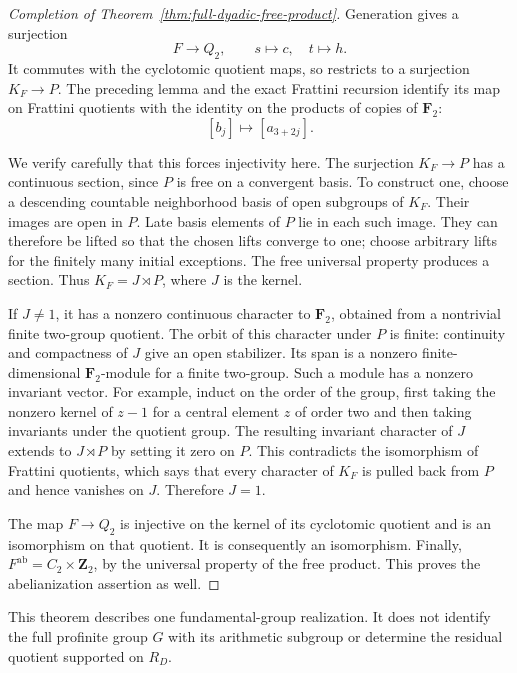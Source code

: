 \begin{proof}[Completion of Theorem~\ref{thm:full-dyadic-free-product}]
Generation gives a surjection
\[
                   F\longrightarrow Q_2,
                   \qquad s\longmapsto c,\quad t\longmapsto h.
\]
It commutes with the cyclotomic quotient maps, so restricts
to a surjection \(K_F\to P\).
The preceding lemma and the exact Frattini recursion identify
its map on Frattini quotients with the identity on the
products of copies of \(\mathbf F_2\):
\[
             [b_j]\longmapsto[a_{3+2j}].
\]

We verify carefully that this forces injectivity here.
The surjection \(K_F\to P\) has a continuous section, since
\(P\) is free on a convergent basis. To construct one, choose
a descending countable neighborhood basis of open subgroups
of \(K_F\). Their images are open in \(P\). Late basis
elements of \(P\) lie in each such image. They can therefore
be lifted so that the chosen lifts converge to one; choose
arbitrary lifts for the finitely many initial exceptions.
The free universal property produces a section.
Thus \(K_F=J\rtimes P\), where \(J\) is the kernel.

If \(J\ne1\), it has a nonzero continuous character to
\(\mathbf F_2\), obtained from a nontrivial finite two-group
quotient. The orbit of this character under \(P\) is finite:
continuity and compactness of \(J\) give an open stabilizer.
Its span is a nonzero finite-dimensional \(\mathbf F_2\)-module
for a finite two-group. Such a module has a nonzero invariant
vector. For example, induct on the order of the group, first
taking the nonzero kernel of \(z-1\) for a central element
\(z\) of order two and then taking invariants under the
quotient group.
The resulting invariant character of \(J\) extends to
\(J\rtimes P\) by setting it zero on \(P\).
This contradicts the isomorphism of Frattini quotients, which
says that every character of \(K_F\) is pulled back from \(P\)
and hence vanishes on \(J\). Therefore \(J=1\).

The map \(F\to Q_2\) is injective on the kernel of its
cyclotomic quotient and is an isomorphism on that quotient.
It is consequently an isomorphism. Finally,
\(F^{\mathrm{ab}}=C_2\times\mathbf Z_2\), by the universal
property of the free product. This proves the abelianization
assertion as well.
\end{proof}

This theorem describes one fundamental-group realization.
It does not identify the full profinite group \(G\) with
its arithmetic subgroup or determine the residual quotient
supported on \(R_D\).
